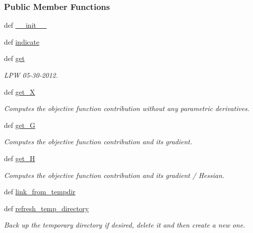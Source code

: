 \subsubsection*{Public Member Functions}
\begin{DoxyCompactItemize}
\item 
def \hyperlink{classforcebalance_1_1leastsq_1_1LeastSquares_a761c0f4121b06e2a74b5fa548a88e400}{\-\_\-\-\_\-init\-\_\-\-\_\-}
\item 
def \hyperlink{classforcebalance_1_1leastsq_1_1LeastSquares_ac8e203986ec7507b627a4545d24239d5}{indicate}
\item 
def \hyperlink{classforcebalance_1_1leastsq_1_1LeastSquares_a2010f34730d88209b738d557cca09a1c}{get}
\begin{DoxyCompactList}\small\item\em L\-P\-W 05-\/30-\/2012. \end{DoxyCompactList}\item 
def \hyperlink{classforcebalance_1_1target_1_1Target_a606dd136f195c267c05a2455405e5949}{get\-\_\-\-X}
\begin{DoxyCompactList}\small\item\em Computes the objective function contribution without any parametric derivatives. \end{DoxyCompactList}\item 
def \hyperlink{classforcebalance_1_1target_1_1Target_afa8cc38c8bba8861c072e789717aa049}{get\-\_\-\-G}
\begin{DoxyCompactList}\small\item\em Computes the objective function contribution and its gradient. \end{DoxyCompactList}\item 
def \hyperlink{classforcebalance_1_1target_1_1Target_a1d2ee27fe86a09769c1816af23b09adb}{get\-\_\-\-H}
\begin{DoxyCompactList}\small\item\em Computes the objective function contribution and its gradient / Hessian. \end{DoxyCompactList}\item 
def \hyperlink{classforcebalance_1_1target_1_1Target_a5aa4958cea0a48138511567a076c5a82}{link\-\_\-from\-\_\-tempdir}
\item 
def \hyperlink{classforcebalance_1_1target_1_1Target_afe815eafab06ac92f10bbf4b88ad95c8}{refresh\-\_\-temp\-\_\-directory}
\begin{DoxyCompactList}\small\item\em Back up the temporary directory if desired, delete it and then create a new one. \end{DoxyCompactList}\item 

\end{DoxyCompactItemize}
